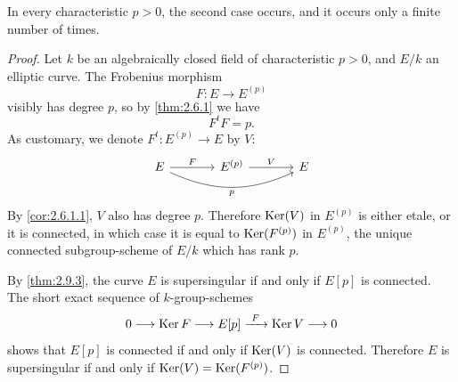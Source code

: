 \begin{theorem}\label{thm:2.9.4}
In every characteristic $p > 0$, the second case occurs, and it occurs only a finite number of times.
\end{theorem}

\begin{proof}
Let $k$ be an algebraically closed field of characteristic $p > 0$, and $E/k$ an elliptic curve. The Frobenius morphism
\[
F : E \longrightarrow E^{(p)}
\]
visibly has degree $p$, so by \eqref{thm:2.6.1} we have
\[
F^t F = p.
\]
As customary, we denote $F^t : E^{(p)} \to E$ by $V$:
\[
\begin{tikzcd}[row sep=large, column sep=large]
  E \arrow[r, "F"] \arrow[rr, bend right=25, "p"'] & E^{(p)} \arrow[r, "V"] & E
\end{tikzcd}
\]
By \eqref{cor:2.6.1.1}, $V$ also has degree $p$. Therefore $\operatorname{Ker}(V)$ in $E^{(p)}$ is either etale, or it is connected, in which case it is equal to $\operatorname{Ker}(F^{(p)})$ in $E^{(p)}$, the unique connected subgroup-scheme of $E/k$ which has rank $p$.

By \eqref{thm:2.9.3}, the curve $E$ is supersingular if and only if $E[p]$ is connected. The short exact sequence of $k$-group-schemes
\[
0 \longrightarrow \operatorname{Ker} F \longrightarrow E[p] \xrightarrow{\ F\ } \operatorname{Ker} V \longrightarrow 0
\]
shows that $E[p]$ is connected if and only if $\operatorname{Ker}(V)$ is connected. Therefore $E$ is supersingular if and only if $\operatorname{Ker}(V) = \operatorname{Ker}(F^{(p)})$.


\end{proof}
